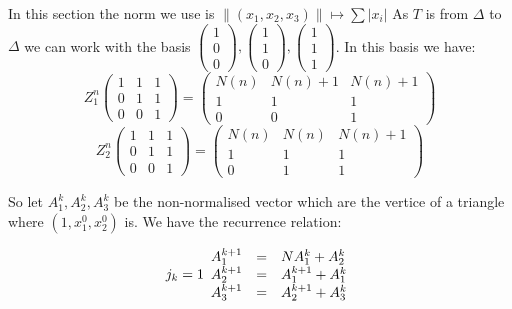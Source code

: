 In this section the norm we use is $\|(x_1,x_2,x_3)\| \mapsto \sum |x_i|$\newline
As $T$ is from $\Delta$ to $\Delta$ we can work with the basis $\begin{pmatrix} 1 \\ 0 \\ 0 \end{pmatrix},\begin{pmatrix} 1 \\ 1 \\ 0 \end{pmatrix}, \begin{pmatrix} 1 \\ 1 \\ 1 \end{pmatrix}$. In this basis we have: \[
Z_1^n \begin{pmatrix} 1 & 1 & 1 \\ 0 & 1 & 1 \\ 0 & 0 & 1 \end{pmatrix}=
\begin{pmatrix} N(n) & N(n)+1 & N(n)+1 \\ 1 & 1 & 1 \\ 0 & 0 & 1 \end{pmatrix}
\]
\[
Z_2^n \begin{pmatrix} 1 & 1 & 1 \\ 0 & 1 & 1 \\ 0 & 0 & 1 \end{pmatrix}=
\begin{pmatrix} N(n) & N(n) & N(n)+1 \\ 1 & 1 & 1 \\ 0 & 1 & 1 \end{pmatrix}
\]

So let $A_1^k,A_2^k,A_3^k$ be the non-normalised vector which are the vertice of a triangle where $(1,x_1^0,x_2^0)$ is. We have the recurrence relation:

\[j_k=1
\begin{array}{c c l}
A_1^{k+1} & = & N A_1^k+A_2^k\\
A_2^{k+1} & = & A_1^{k+1} + A_1^k \\
A_3^{k+1} & = & A_2^{k+1} + A_3^k
\end{array}
\]

